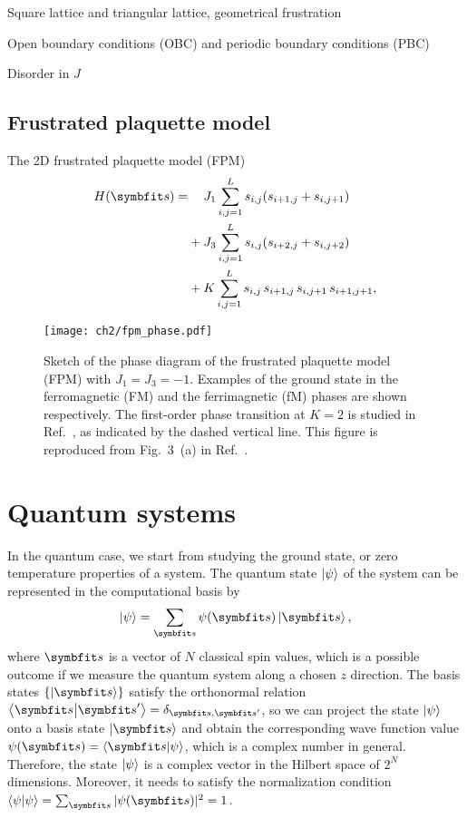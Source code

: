 Square lattice and triangular lattice, geometrical frustration

Open boundary conditions (OBC) and periodic boundary conditions (PBC)

Disorder in $J$

\subsection{Frustrated plaquette model}

The 2D frustrated plaquette model (FPM)
\begin{align}
H(\vs) = &\phantom{{}+{}} J_1 \sum_{i, j = 1}^L s_{i, j} (s_{i + 1, j} + s_{i, j + 1}) \nonumber \\
&+ J_3 \sum_{i, j = 1}^L s_{i, j} (s_{i + 2, j} + s_{i, j + 2}) \nonumber \\
&+ K \sum_{i, j = 1}^L s_{i, j} \, s_{i + 1, j} \, s_{i, j + 1} \, s_{i + 1, j + 1},
\label{eq:fpm}
\end{align}

\begin{figure}[htb]
\centering
\texttt{[image: ch2/fpm\_phase.pdf]}
\caption{
Sketch of the phase diagram of the frustrated plaquette model (FPM) with $J_1 = J_3 = -1$.
Examples of the ground state in the ferromagnetic (FM) and the ferrimagnetic (fM) phases are shown respectively.
The first-order phase transition at $K = 2$ is studied in Ref.~\cite{wu2021unbiased}, as indicated by the dashed vertical line.
This figure is reproduced from Fig.~3~(a) in Ref.~\cite{wu2021unbiased}.
}
\label{fig:fpm-phase}
\end{figure}

\section{Quantum systems}

In the quantum case, we start from studying the ground state, or zero temperature properties of a system. The quantum state $\ket{\psi}$ of the system can be represented in the computational basis by
\begin{equation}
\ket{\psi} = \sum_\vs \psi(\vs) \ket{\vs},
\end{equation}
where $\vs$ is a vector of $N$ classical spin values, which is a possible outcome if we measure the quantum system along a chosen $z$ direction. The basis states $\{\ket{\vs}\}$ satisfy the orthonormal relation $\ip{\vs}{\vs'} = \delta_{\vs, \vs'}$, so we can project the state $\ket{\psi}$ onto a basis state $\ket{\vs}$ and obtain the corresponding wave function value $\psi(\vs) = \ip{\vs}{\psi}$, which is a complex number in general. Therefore, the state $\ket{\psi}$ is a complex vector in the Hilbert space of $2^N$ dimensions. Moreover, it needs to satisfy the normalization condition $\ip{\psi}{\psi} = \sum_{\vs} |\psi(\vs)|^2 = 1$.

